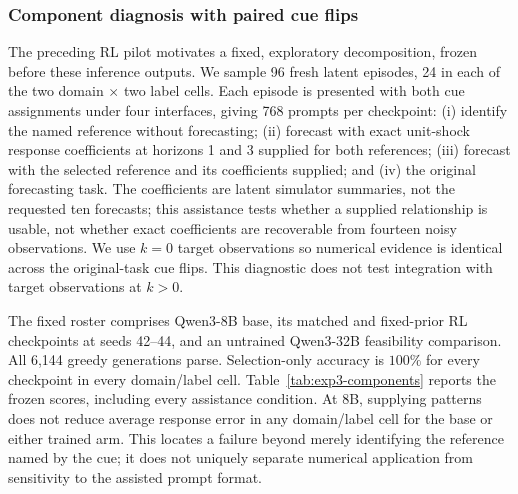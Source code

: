 \subsubsection{Component diagnosis with paired cue flips}
\label{app:exp3-components}

The preceding RL pilot motivates a fixed, exploratory decomposition, frozen
before these inference outputs. We sample 96 fresh latent episodes, 24 in each
of the two domain $\times$ two label cells. Each episode is presented with both
cue assignments under four interfaces, giving 768 prompts per checkpoint:
(i) identify the named reference without forecasting; (ii) forecast with exact
unit-shock response coefficients at horizons 1 and 3 supplied for both
references; (iii) forecast with the selected reference and its coefficients
supplied; and (iv) the original forecasting task. The coefficients are latent
simulator summaries, not the requested ten forecasts; this assistance tests
whether a supplied relationship is usable, not whether exact coefficients are
recoverable from fourteen noisy observations. We use $k=0$ target observations
so numerical evidence is identical across the original-task cue flips. This
diagnostic does not test integration with target observations at $k>0$.

The fixed roster comprises Qwen3-8B base, its matched and fixed-prior RL
checkpoints at seeds 42--44, and an untrained Qwen3-32B feasibility comparison.
All 6,144 greedy generations parse. Selection-only accuracy is $100\%$ for
every checkpoint in every domain/label cell. Table~\ref{tab:exp3-components}
reports the frozen scores, including every assistance condition. At 8B,
supplying patterns does not reduce average response error in any domain/label
cell for the base or either trained arm. This locates a failure beyond merely
identifying the reference named by the cue; it does not uniquely separate
numerical application from sensitivity to the assisted prompt format.

\begin{table}[htbp]
\centering\small

\caption{\textbf{Reference naming succeeds while forecasting remains difficult.}
Name is selection-only accuracy; Original, Both, and Selected are response MAE
for the three forecast interfaces. Trained rows average all three seeds, not
selected endpoints. Each checkpoint contributes 24 paired episodes per cell.
Domain scales differ, so compare interfaces within a domain.}
\label{tab:exp3-components}
\end{table}

